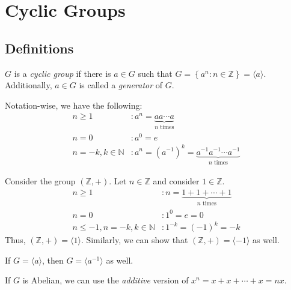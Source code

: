 \chapter{Cyclic Groups}

\section{Definitions}

\begin{definition}
    \(G\) is a \textit{cyclic group} if there is \(a \in G\) such that \(G = \left\{a^n : n \in \mathbb{Z}\right\} = \langle a \rangle\). Additionally, \(a \in G\) is called a \textit{generator} of \(G\).

    Notation-wise, we have the following:
    \[
    \begin{aligned}
        n \geq 1 &: a^n = \underbrace{a a \cdots a}_\text{\(n\) times} \\
        n = 0 &: a^0 = e \\
        n = -k, k \in \mathbb{N} &: a^{n} = (a^{-1})^k = \underbrace{a^{-1} a^{-1} \cdots a^{-1}}_\text{\(n\) times}
    \end{aligned}
    \]
\end{definition}

\begin{nexample}
    Consider the group \((\mathbb{Z}, +)\). Let \(n \in \mathbb{Z}\) and consider \(1 \in \mathbb{Z}\).
    \[
    \begin{aligned}
        n \geq 1 &: n = \underbrace{1+1+\cdots+1}_\text{\(n\) times} \\
        n = 0 &: 1^0 = e = 0 \\
        n \leq -1, n=-k, k \in \mathbb{N} &: 1^{-k} = (-1)^k = -k
    \end{aligned}
    \]
    Thus, \((\mathbb{Z}, +) = \langle 1 \rangle\). Similarly, we can show that \((\mathbb{Z}, +) = \langle -1 \rangle\) as well.
\end{nexample}

\begin{remark}
    If \(G = \langle a \rangle\), then \(G = \langle a^{-1} \rangle\) as well.
\end{remark}

\begin{remark}
    If \(G\) is Abelian, we can use the \textit{additive} version of \(x^n = x+x+\cdots+x = nx\).
\end{remark}

